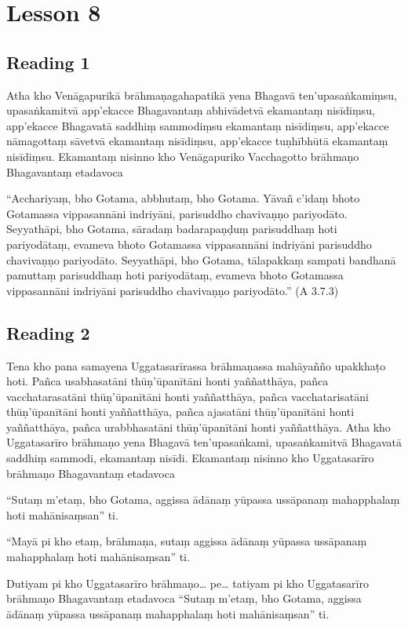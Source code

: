 \chapter{Lesson 8}

\section*{Reading 1}

Atha kho Venāgapurikā brāhmaṇagahapatikā yena Bhagavā ten’upasaṅkamiṃsu, upasaṅkamitvā app’ekacce Bhagavantaṃ abhivādetvā ekamantaṃ nisīdiṃsu, app’ekacce Bhagavatā saddhiṃ sammodiṃsu ekamantaṃ nisīdiṃsu, app’ekacce nāmagottaṃ sāvetvā ekamantaṃ nisīdiṃsu, app’ekacce tuṇhībhūtā ekamantaṃ nisīdiṃsu. Ekamantaṃ nisinno kho Venāgapuriko Vacchagotto brāhmaṇo Bhagavantaṃ etadavoca

“Acchariyaṃ, bho Gotama, abbhutaṃ, bho Gotama. Yāvañ c’idaṃ bhoto Gotamassa vippasannāni indriyāni, parisuddho chavivaṇṇo pariyodāto. Seyyathāpi, bho Gotama, sāradaṃ badarapaṇḍuṃ parisuddhaṃ hoti pariyodātaṃ, evameva bhoto Gotamassa vippasannāni indriyāni parisuddho chavivaṇṇo pariyodāto. Seyyathāpi, bho Gotama, tālapakkaṃ sampati bandhanā pamuttaṃ parisuddhaṃ hoti pariyodātaṃ, evameva bhoto Gotamassa vippasannāni indriyāni parisuddho chavivaṇṇo pariyodāto.” (A 3.7.3)

\section*{Reading 2}

Tena kho pana samayena Uggatasarīrassa brāhmaṇassa mahāyañño upakkhaṭo hoti. Pañca usabhasatāni thūṇ’ūpanītāni honti yaññatthāya, pañca vacchatarasatāni thūṇ’ūpanītāni honti yaññatthāya, pañca vacchatarisatāni thūṇ’ūpanītāni honti yaññatthāya, pañca ajasatāni thūṇ’ūpanītāni honti yaññatthāya, pañca urabbhasatāni thūṇ’ūpanītāni honti yaññatthāya. Atha kho Uggatasarīro brāhmaṇo yena Bhagavā ten’upasaṅkami, upasaṅkamitvā Bhagavatā saddhiṃ sammodi, ekamantaṃ nisīdi. Ekamantaṃ nisinno kho Uggatasarīro brāhmaṇo Bhagavantaṃ etadavoca

“Sutaṃ m’etaṃ, bho Gotama, aggissa ādānaṃ yūpassa ussāpanaṃ mahapphalaṃ hoti mahānisaṃsan” ti.

“Mayā pi kho etaṃ, brāhmaṇa, sutaṃ aggissa ādānaṃ yūpassa ussāpanaṃ mahapphalaṃ hoti mahānisaṃsan” ti.

Dutiyam pi kho Uggatasarīro brāhmaṇo… pe… tatiyam pi kho Uggatasarīro brāhmaṇo Bhagavantaṃ etadavoca “Sutaṃ m’etaṃ, bho Gotama, aggissa ādānaṃ yūpassa ussāpanaṃ mahapphalaṃ hoti mahānisaṃsan” ti.

